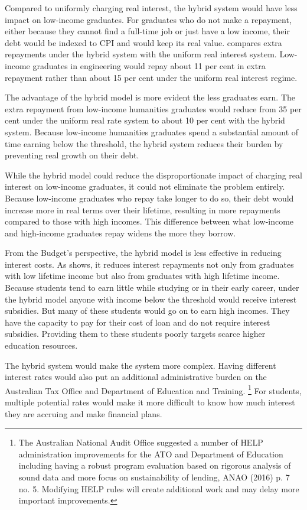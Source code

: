\documentclass[embargoed]{grattan}
\begin{document}
{Compared to uniformly charging real interest, the hybrid system would have less impact on low-income graduates.
For graduates who do not make a repayment, either because they cannot find a full-time job or just have a low income, their debt would be indexed to \gls{CPI} and would keep its real value.
 compares extra repayments under the hybrid system with the uniform real interest system.
Low-income graduates in engineering would repay about 11 per cent in extra repayment rather than about 15 per cent under the uniform real interest regime.

The advantage of the hybrid model is more evident the less graduates earn.
The extra repayment from low-income humanities graduates would reduce from 35 per cent under the uniform real rate system to about 10 per cent with the hybrid system.
Because low-income humanities graduates spend a substantial amount of time earning below the threshold, the hybrid system reduces their burden by preventing real growth on their debt.

While the hybrid model could reduce the disproportionate impact of charging real interest on low-income graduates, it could not eliminate the problem entirely.
Because low-income graduates who repay take longer to do so, their debt would increase more in real terms over their lifetime, resulting in more repayments compared to those with high incomes.
This difference between what low-income and high-income graduates repay widens the more they borrow.

From the Budget's perspective, the hybrid model is less effective in reducing interest costs.
As  shows, it reduces interest repayments not only from graduates with low lifetime income but also from graduates with high lifetime income.
Because students tend to earn little while studying or in their early career, under the hybrid model anyone with income below the threshold would receive interest subsidies.
But many of these students would go on to earn high incomes.
They have the capacity to pay for their cost of loan and do not require interest subsidies.
Providing them to these students poorly targets scarce higher education resources.

The hybrid system would make the system more complex.
Having different interest rates would also put an additional administrative burden on the Australian Tax Office and Department of Education and Training.%
\footnote{The Australian National Audit Office suggested a number of \gls{HELP} administration improvements for the \gls{ATO} and Department of Education including having a robust program evaluation based on rigorous analysis of sound data and more focus on sustainability of lending, ANAO (2016) p. 7 no. 5.
Modifying \gls{HELP} rules will create additional work and may delay more important improvements.} For students, multiple potential rates would make it more difficult to know how much interest they are accruing and make financial plans.

}
\end{document}
